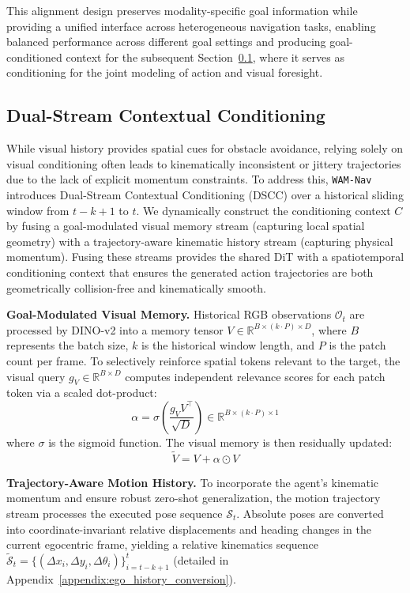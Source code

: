 \documentclass{article}
\begin{document}
This alignment design preserves modality-specific goal information while providing a unified interface across heterogeneous navigation tasks, enabling balanced performance across different goal settings and producing goal-conditioned context for the subsequent Section~\ref{sec:dscc}, where it serves as conditioning for the joint modeling of action and visual foresight.

\subsection{Dual-Stream Contextual Conditioning}
\label{sec:dscc}

While visual history provides spatial cues for obstacle avoidance, relying solely on visual conditioning often leads to kinematically inconsistent or jittery trajectories due to the lack of explicit momentum constraints. To address this, \texttt{WAM-Nav} introduces Dual-Stream Contextual Conditioning (DSCC) over a historical sliding window from $t-k+1$ to $t$. We dynamically construct the conditioning context $C$ by fusing a goal-modulated visual memory stream (capturing local spatial geometry) with a trajectory-aware kinematic history stream (capturing physical momentum). Fusing these streams provides the shared DiT with a spatiotemporal conditioning context that ensures the generated action trajectories are both geometrically collision-free and kinematically smooth.

\textbf{Goal-Modulated Visual Memory.} 
Historical RGB observations $\mathcal{O}_t$ are processed by DINO-v2 \citep{oquab2023dinov2} into a memory tensor $V \in \mathbb{R}^{B \times (k \cdot P) \times D}$, where $B$ represents the batch size, $k$ is the historical window length, and $P$ is the patch count per frame. To selectively reinforce spatial tokens relevant to the target, the visual query $g_V \in \mathbb{R}^{B \times D}$ computes independent relevance scores for each patch token via a scaled dot-product:
\begin{equation}
    \alpha = \sigma \left( \frac{g_V V^\top}{\sqrt{D}} \right) \in \mathbb{R}^{B \times (k \cdot P) \times 1}
\end{equation}
where $\sigma$ is the sigmoid function. The visual memory is then residually updated:
\begin{equation}
    \tilde{V} = V + \alpha \odot V
\end{equation}

\textbf{Trajectory-Aware Motion History.} 
To incorporate the agent's kinematic momentum and ensure robust zero-shot generalization, the motion trajectory stream processes the executed pose sequence $\mathcal{S}_t$. Absolute poses are converted into coordinate-invariant relative displacements and heading changes in the current egocentric frame, yielding a relative kinematics sequence $\tilde{\mathcal{S}}_t = \{(\Delta x_i, \Delta y_i, \Delta \theta_i)\}_{i=t-k+1}^{t}$ (detailed in Appendix~\ref{appendix:ego_history_conversion}). 
\end{document}
